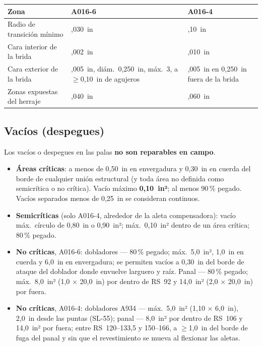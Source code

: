 \begin{center}
\small
\begin{tabularx}{\linewidth}{@{}>{\raggedright\arraybackslash}X>{\raggedright\arraybackslash}X>{\raggedright\arraybackslash}X@{}}
\toprule
Zona & A016-6 & A016-4 \\
\midrule
Radio de transición mínimo & 0,030~in & 0,10~in \\
Cara interior de la brida & 0,002~in & 0,010~in \\
Cara exterior de la brida & 0,005~in, diám.\ 0,250~in, máx.\ 3, a $\ge$0,10~in de agujeros & 0,005~in en 0,250~in fuera de la brida \\
Zonas expuestas del herraje & 0,040~in & 0,060~in \\
\bottomrule
\end{tabularx}
\end{center}


\subsection{Vacíos (despegues)}

\begin{advertencia}
Los vacíos o despegues en las palas \textbf{no son reparables en campo}.
\end{advertencia}

\begin{itemize}
\item \textbf{Áreas críticas}: a menos de 0,50~in en envergadura y 0,30~in en cuerda del borde de cualquier unión estructural (y toda área no definida como semicrítica o no crítica). Vacío máximo \textbf{0,10~in²}; al menos 90\,\% pegado. Vacíos separados menos de 0,25~in se consideran continuos.
\item \textbf{Semicríticas} (solo A016-4, alrededor de la aleta compensadora): vacío máx.\ círculo de 0,80~in o 0,90~in²; máx.\ 0,10~in² dentro de un área crítica; 80\,\% pegado.
\item \textbf{No críticas}, A016-6: dobladores --- 80\,\% pegado; máx.\ 5,0~in², 1,0~in en cuerda y 6,0~in en envergadura; se permiten vacíos a 0,30~in del borde de ataque del doblador donde envuelve larguero y raíz. Panal --- 80\,\% pegado; máx.\ 8,0~in² (1,0 $\times$ 20,0~in) por dentro de RS~92 y 14,0~in² (2,0 $\times$ 20,0~in) por fuera.
\item \textbf{No críticas}, A016-4: dobladores A934 --- máx.\ 5,0~in² (1,10 $\times$ 6,0~in), 2,0~in desde las puntas (SL-55); panal --- 8,0~in² por dentro de RS~106 y 14,0~in² por fuera; entre RS~120--133,5 y 150--166, a $\ge$1,0~in del borde de fuga del panal y sin que el revestimiento se mueva al flexionar las aletas.
\end{itemize}

